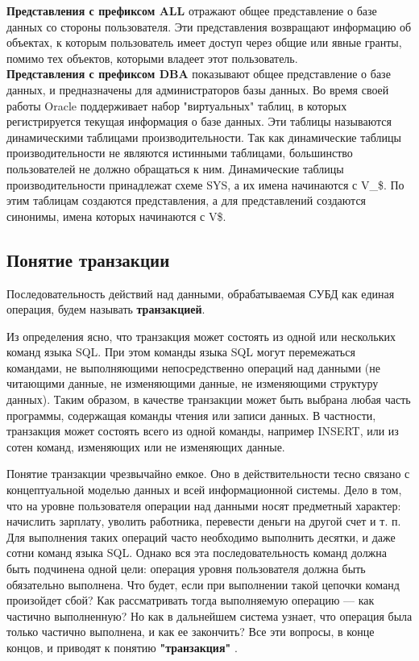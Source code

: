 \textbf{Представления с префиксом ALL} отражают общее представление о базе данных со стороны пользователя. Эти представления возвращают информацию об объектах, к которым пользователь имеет доступ через общие или явные гранты, помимо тех объектов, которыми владеет этот пользователь. ~\\

\textbf{Представления с префиксом DBA} показывают общее представление о базе данных, и предназначены для администраторов базы данных. Во время своей работы Oracle поддерживает набор "виртуальных" таблиц, в которых регистрируется текущая информация о базе данных. Эти таблицы называются динамическими таблицами производительности. Так как динамические таблицы производительности не являются истинными таблицами, большинство пользователей не должно обращаться к ним. Динамические таблицы производительности принадлежат схеме SYS, а их имена начинаются с V\_\$. По этим таблицам создаются представления, а для представлений создаются синонимы, имена которых начинаются с V\$.

\subsection{Понятие транзакции}

\begin{grayquote}
    Последовательность действий над данными, обрабатываемая СУБД как единая операция, будем называть \textbf{транзакцией}.
\end{grayquote}

Из определения ясно, что транзакция может состоять из одной или нескольких команд языка SQL. При этом команды языка SQL могут перемежаться командами, не выполняющими непосредственно операций над данными (не читающими данные, не изменяющими данные, не изменяющими структуру данных). Таким образом, в качестве транзакции может быть выбрана любая часть программы, содержащая команды чтения или записи данных. В частности, транзакция может состоять всего из одной команды, например INSERT, или из сотен команд, изменяющих или не изменяющих данные.


Понятие транзакции чрезвычайно емкое. Оно в действительности тесно связано с концептуальной моделью данных и всей информационной системы. Дело в том, что на уровне пользователя операции над данными носят предметный характер: начислить зарплату, уволить работника, перевести деньги на другой счет и т. п. Для выполнения таких операций часто необходимо выполнить десятки, и даже сотни команд языка SQL. Однако вся эта последовательность команд должна быть подчинена одной цели: операция уровня пользователя должна быть обязательно выполнена. Что будет, если при выполнении такой цепочки команд произойдет сбой? Как рассматривать тогда выполняемую операцию — как частично выполненную? Но как в дальнейшем система узнает, что операция была только частично выполнена, и как ее закончить? Все эти вопросы, в конце концов, и приводят к понятию \textbf{"транзакция"} \autocite{Pirogov2009}.


